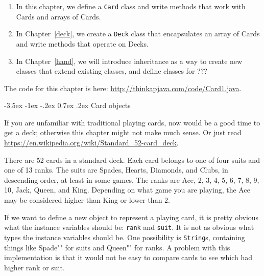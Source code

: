 \documentclass[12pt]{book}
\makeatletter
\theoremstyle{exercise}
\newcommand{\java}[1]{\verb"#1"}
\renewcommand{\section}{\@startsection{section}{1}{\z@}%
    {-3.5ex \@plus -1ex \@minus -.2ex}%
    {0.7ex \@plus.2ex}%
    {\normalfont\Large\bfseries}}
\newcommand{\java}[1]{\lstinline{#1}} %
\makeatother
\begin{document}
\begin{enumerate}

\item In this chapter, we define a \java{Card} class and write methods that work with Cards and arrays of Cards.

\item In Chapter~\ref{deck}, we create a \java{Deck} class that encapsulates an array of Cards and write methods that operate on Decks.

\item In Chapter~\ref{hand}, we will introduce inheritance as a way to create new classes that extend existing classes, and define classes for ???


\end{enumerate}


The code for this chapter is here: \url{http://thinkapjava.com/code/Card1.java}.


\section{Card objects}
\label{card}


If you are unfamiliar with traditional playing cards, now would be a good time to get a deck; otherwise this chapter might not make much sense.
Or just read \url{https://en.wikipedia.org/wiki/Standard_52-card_deck}.


There are 52 cards in a standard deck.
Each card belongs to one of four suits and one of 13 ranks.
The suits are Spades, Hearts, Diamonds, and Clubs, in descending order, at least in some games.
The ranks are Ace, 2, 3, 4, 5, 6, 7, 8, 9, 10, Jack, Queen, and King.
Depending on what game you are playing, the Ace may be considered higher than King or lower than 2.

If we want to define a new object to represent a playing card, it is pretty obvious what the instance variables should be: \java{rank} and \java{suit}.
It is not as obvious what types the instance variables should be.
One possibility is \java{String}s, containing things like \java{"Spade"} for suits and \java{"Queen"} for ranks.
A problem with this implementation is that it would not be easy to compare cards to see which had higher rank or suit.
\end{document}
